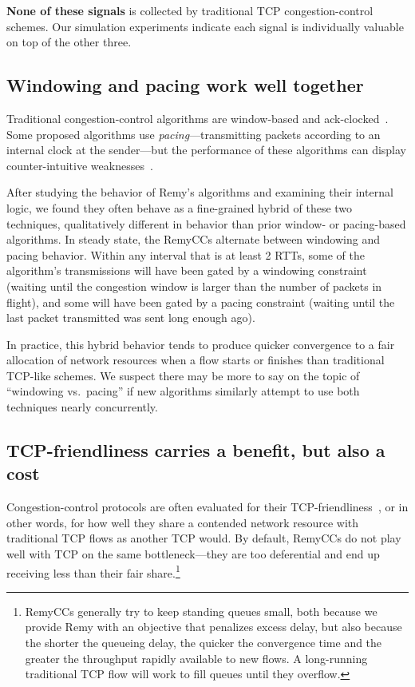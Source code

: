 \textbf{None of these signals} is collected by traditional TCP
congestion-control schemes. Our simulation experiments indicate each
signal is individually valuable on top of the other three.

\subsection{Windowing and pacing work well together}

Traditional congestion-control algorithms are window-based and
ack-clocked~\cite{Srikant}. Some proposed algorithms use
\emph{pacing}---transmitting packets according to an internal clock at
the sender---but the performance of these algorithms can display
counter-intuitive weaknesses~\cite{understandingpacing}.

After studying the behavior of Remy's algorithms and examining their
internal logic, we found they often behave as a fine-grained
hybrid of these two techniques, qualitatively different in behavior
than prior window- or pacing-based algorithms. In steady state, the
RemyCCs alternate between windowing and
pacing behavior. Within any interval that is at least 2 RTTs, some of
the algorithm's transmissions will have been gated by a windowing
constraint (waiting until the congestion window is larger than the
number of packets in flight), and some will have been gated by a
pacing constraint (waiting until the last packet transmitted was sent
long enough ago).

In practice, this hybrid behavior tends to produce quicker convergence to a
fair allocation of network resources when a flow starts or finishes
than traditional TCP-like schemes. We suspect there may be more to say
on the topic of ``windowing vs.~pacing'' if new algorithms similarly
attempt to use both techniques nearly concurrently.

\subsection{TCP-friendliness carries a benefit, but also a cost}

Congestion-control protocols are often evaluated for their
TCP-friendliness~\cite{friendlysurvey}, or in other words, for how
well they share a contended network resource with traditional TCP
flows as another TCP would.  By default, RemyCCs do not
play well with TCP on the same bottleneck---they are too deferential
and end up receiving less than their fair share.\footnote{RemyCCs
  generally try to keep standing queues small, both because we provide
  Remy with an objective that penalizes excess delay, but also because
  the shorter the queueing delay, the quicker the convergence time and
  the greater the throughput rapidly available to new flows. A long-running
  traditional TCP flow will work to fill queues until they overflow.}

